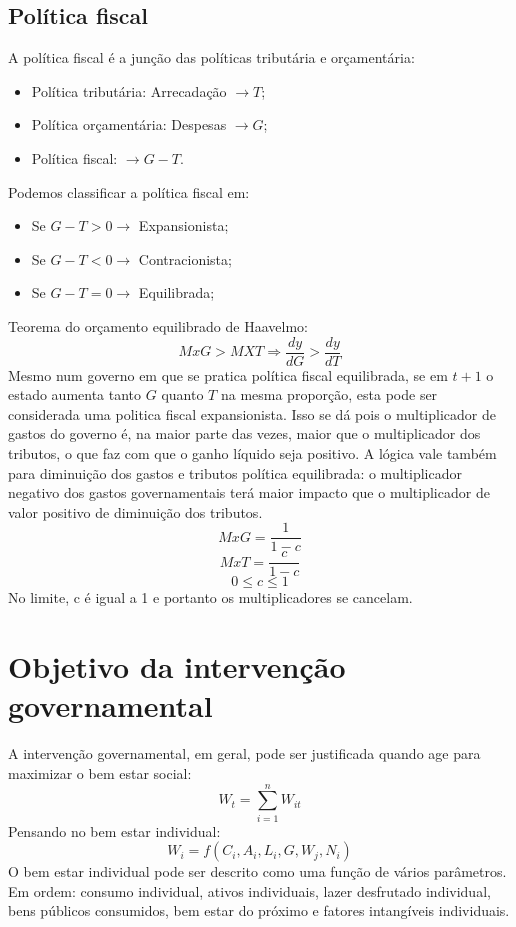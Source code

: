 \documentclass[12pt,a4paper,oneside,brazil]{abntex2}
\begin{document}
\subsection{Política fiscal}
A política fiscal é a junção das políticas tributária e orçamentária:
\begin{itemize}
\item Política tributária: Arrecadação $\rightarrow T$;
\item Política orçamentária: Despesas $\rightarrow G$;
\item Política fiscal: $\rightarrow G - T$.
\end{itemize}
Podemos classificar a política fiscal em:
\begin{itemize}
\item Se $G - T > 0 \rightarrow$ Expansionista;
\item Se $G - T < 0 \rightarrow$ Contracionista;
\item Se $G - T = 0 \rightarrow$ Equilibrada;
\end{itemize}
Teorema do orçamento equilibrado de Haavelmo:
\[ Mx G > MX T \Rightarrow \frac{dy}{dG} > \frac{dy}{dT}\]
Mesmo num governo em que se pratica política fiscal equilibrada, se em $t + 1$ o estado aumenta tanto $G$ quanto $T$ na mesma proporção, esta pode ser considerada uma politica fiscal expansionista. Isso se dá pois o multiplicador de gastos do governo é, na maior parte das vezes, maior que o multiplicador dos tributos, o que faz com que o ganho líquido seja positivo. A lógica vale também para diminuição dos gastos e tributos política equilibrada: o multiplicador negativo dos gastos governamentais terá maior impacto que o multiplicador de valor positivo de diminuição dos tributos.
\[ Mx G = \frac{1}{1-c}\]
\[ Mx T = \frac{c}{1-c}\]
\[ 0 \leq c \leq 1\]
No limite, c é igual a 1 e portanto os multiplicadores se cancelam.
\section{Objetivo da intervenção governamental}
A intervenção governamental, em geral, pode ser justificada quando age para maximizar o bem estar social:
\[  W_t = \sum^{n}_{i = 1} W_{it} \]
Pensando no bem estar individual:
\[ W_i = f(C_i, A_i, L_i, G, W_j, N_i) \]
O bem estar individual pode ser descrito como uma função de vários parâmetros. Em ordem: consumo individual, ativos individuais, lazer desfrutado individual, bens públicos consumidos, bem estar do próximo e fatores intangíveis individuais.
\end{document}

